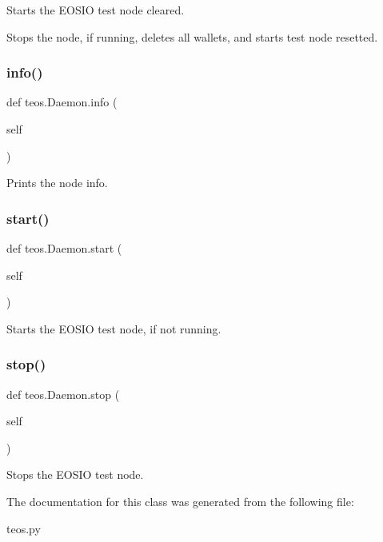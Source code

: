 \begin{DoxyVerb}Starts the EOSIO test node cleared.

Stops the node, if running, deletes all wallets, and starts test node
resetted. 
\end{DoxyVerb}
 \mbox{\label{classteos_1_1Daemon_a3bd22437bedc3d98bf14862d8410d7e0}} 
\subsubsection{\texorpdfstring{info()}{info()}}
{\footnotesize\ttfamily def teos.\+Daemon.\+info (\begin{DoxyParamCaption}\item[{}]{self }\end{DoxyParamCaption})}

\begin{DoxyVerb}Prints the node info.
\end{DoxyVerb}
 \mbox{\label{classteos_1_1Daemon_add7344f11f4cb6e389d956bacb8f0cc0}} 
\subsubsection{\texorpdfstring{start()}{start()}}
{\footnotesize\ttfamily def teos.\+Daemon.\+start (\begin{DoxyParamCaption}\item[{}]{self }\end{DoxyParamCaption})}

\begin{DoxyVerb}Starts the EOSIO test node, if not running.
\end{DoxyVerb}
 \mbox{\label{classteos_1_1Daemon_af9cd65cfb597eadcf18ba5c82963202e}} 
\subsubsection{\texorpdfstring{stop()}{stop()}}
{\footnotesize\ttfamily def teos.\+Daemon.\+stop (\begin{DoxyParamCaption}\item[{}]{self }\end{DoxyParamCaption})}

\begin{DoxyVerb}Stops the EOSIO test node.
\end{DoxyVerb}
 

The documentation for this class was generated from the following file\+:\begin{DoxyCompactItemize}
\item 
teos.\+py\end{DoxyCompactItemize}
